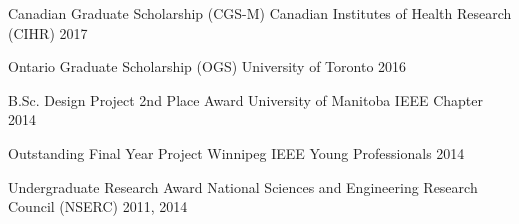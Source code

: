 



\begin{cvhonors}

  \cvhonor
    {Canadian Graduate Scholarship (CGS-M)} %
    {Canadian Institutes of Health Research (CIHR)} %
    {} %
    {2017} %

  \cvhonor
    {Ontario Graduate Scholarship (OGS)} %
    {University of Toronto} %
    {} %
    {2016} %

  \cvhonor
    {B.Sc. Design Project 2nd Place Award} %
    {University of Manitoba IEEE Chapter} %
    {} %
    {2014} %

  \cvhonor
    {Outstanding Final Year Project} %
    {Winnipeg IEEE Young Professionals} %
    {} %
    {2014} %

  \cvhonor
    {Undergraduate Research Award} %
    {National Sciences and Engineering Research Council (NSERC)} %
    {} %
    {2011, 2014} %

\end{cvhonors}




